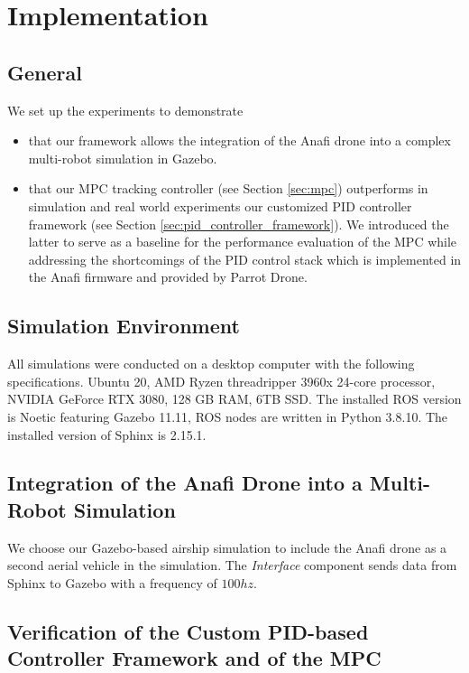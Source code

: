 \section{Implementation}\label{sec:implementation}
\subsection{General}
We set up the experiments to demonstrate
\begin{itemize}
\item  that our framework allows the integration of the Anafi drone into a complex multi-robot simulation in Gazebo.
\item  that our MPC  tracking controller (see Section \ref{sec:mpc}) outperforms in simulation and real world experiments  our customized PID controller framework (see Section \ref{sec:pid_controller_framework}). We introduced the latter to serve as a  baseline for the performance evaluation of the MPC while addressing the shortcomings of the PID control stack which is implemented in the Anafi firmware and provided by Parrot Drone.
\end{itemize}
\subsection{Simulation Environment}
All simulations were conducted on a desktop computer with the following specifications. Ubuntu 20, AMD Ryzen threadripper 3960x 24-core processor, NVIDIA GeForce RTX 3080, 128 GB RAM, 6TB SSD. The installed ROS version is  Noetic featuring Gazebo 11.11, ROS nodes are written in Python 3.8.10. The installed version of Sphinx is 2.15.1.

\subsection{Integration of the Anafi Drone into a Multi-Robot Simulation}
We choose our Gazebo-based airship simulation \cite{price2022} to include the Anafi drone as a second aerial vehicle in the simulation. The \textit{Interface} component sends data from Sphinx to Gazebo with a frequency of $100\si{hz}$. 

\subsection{Verification of the Custom PID-based Controller Framework and of the MPC}
\setlength{\tabcolsep}{4pt}

